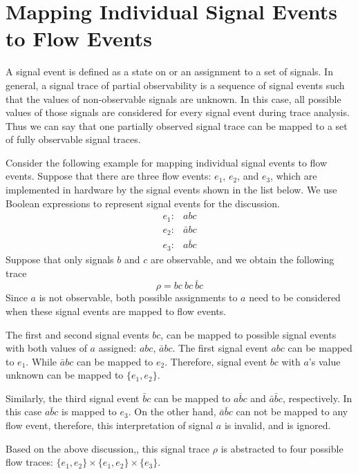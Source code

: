 \documentclass[12pt,frontmatter,copyright,thesis]{usfmanus}
\begin{document}
\section{Mapping Individual Signal Events to Flow Events}

A signal event is defined as a state on or an
assignment to a set of signals.
In general, a signal trace of partial observability is a sequence of signal events
such that the values of non-observable signals are unknown. In this case, all possible values of those signals
are considered for every signal event during trace analysis. 
Thus we can say that one partially observed signal
 trace can be mapped to a set of fully observable signal traces.

Consider the following example for
mapping individual signal events to flow events.
Suppose that there are three flow events:
$e_1$, $e_2$, and $e_3$, which are implemented in hardware
by the signal events shown in the list below.  We use
Boolean expressions to represent signal events for the
discussion.
\[
\begin{array}{cl}
e_1: & abc\\
e_2: & \bar{a}bc\\
e_3: & a\bar{b}c
\end{array}
\] 
Suppose that only signals $b$ and $c$ are observable, and we
obtain the following trace
\[
\rho = bc\ bc \ \bar{b}c
\]
Since $a$ is not observable, both possible assignments to $a$
need to be considered
when these signal events are mapped to 
flow events.

The first and second signal events $bc$, can be
mapped to possible signal events with both values of $a$ assigned:
$abc$, $\bar{a}bc$.
The first signal event $abc$ can be mapped to $e_1$.
While $\bar{a}bc$ can be mapped to $e_2$. Therefore,
signal event $bc$ with $a$'s value unknown can be mapped to
 $\{e_1,e_2\}$. 

Similarly, the third signal event $\bar{b}c$ can be mapped to 
$a\bar{b}c$
and
$\bar{a}\bar{b}c$,
respectively.
In this case $a\bar{b}c$ is mapped to $e_3$. On the other hand,
$\bar{a}\bar{b}c$ can not be mapped
to any flow event, therefore,
this interpretation of signal $a$ is invalid, and is ignored.

Based on the above discussion,,
this signal trace $\rho$ is abstracted to four possible flow traces: $\{e_1,
e_2\} \times \{e_1, e_2\} \times \{e_3\}$.
\end{document}
